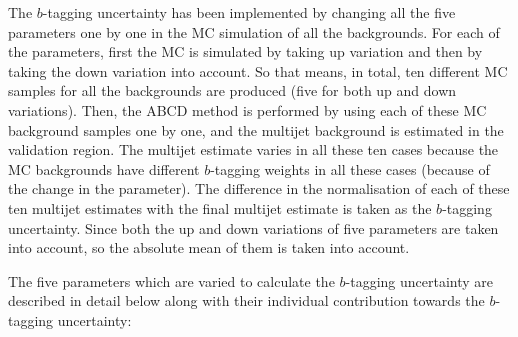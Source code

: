 The $b$-tagging uncertainty has been implemented by changing all the five parameters one by one in the MC simulation of all the backgrounds. For each of the parameters, first the MC is simulated by taking up variation and then by taking the down variation into account. So that means, in total, ten different MC samples for all the backgrounds are produced (five for both up and down variations). Then, the ABCD method is performed by using each of these MC background samples one by one, and the multijet background is estimated in the validation region. The multijet estimate varies in all these ten cases because the MC backgrounds have different $b$-tagging weights in all these cases (because of the change in the parameter). The difference in the normalisation of each of these ten multijet estimates with the final multijet estimate is taken as the $b$-tagging uncertainty. Since both the up and down variations of five parameters are taken into account, so the absolute mean of them is taken into account. 

The five parameters which are varied to calculate the $b$-tagging uncertainty are described in detail below along with their individual contribution towards the $b$-tagging uncertainty:

